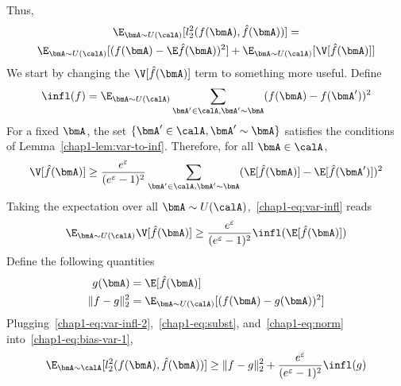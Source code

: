 Thus, 
\begin{multline}\label{chap1-eq:bias-var-1}
  \E_{\bmA \sim U(\calA)}[l_2^2(f(\bmA),\hat{f}(\bmA))] = \\ \E_{\bmA \sim
  U(\calA)}[(f(\bmA) - \E\hat{f}(\bmA))^2] + \E_{\bmA \sim
  U(\calA)}[\V[\hat{f}(\bmA)]]
\end{multline}
We start by changing the $\V[\hat{f}(\bmA)]$ term to something more useful. Define
\[
    \infl(f) = \E_{\bmA \sim U(\calA)} \sum_{\bmA' \in \calA, \bmA' \sim \bmA} (f(\bmA) - f(\bmA'))^2
\]
For a fixed $\bmA$, the set $\{\bmA' \in \calA, \bmA' \sim \bmA\}$ satisfies the conditions of Lemma~\ref{chap1-lem:var-to-inf}. Therefore, for all $\bmA \in \calA$, 
\begin{equation}\label{chap1-eq:var-infl}
\V[\hat{f}(\bmA)] \geq \frac{e^\varepsilon}{(e^\varepsilon-1)^2} \sum_{\bmA' \in \calA, \bmA' \sim \bmA} (\E[\hat{f}(\bmA)] - \E[\hat{f}(\bmA')])^2
\end{equation}
Taking the expectation over all $\bmA \sim U(\calA)$,~\eqref{chap1-eq:var-infl} reads 
\begin{equation}\label{chap1-eq:var-infl-2}
    \E_{\bmA \sim U(\calA)} \V[\hat{f}(\bmA)] \geq \frac{e^\varepsilon}{(e^\varepsilon-1)^2} \infl(\E[\hat{f}(\bmA)])
\end{equation}
Define the following quantities
\begin{align}
    g(\bmA) &= \E[\hat{f}(\bmA)] \label{chap1-eq:subst} \\
    \|f-g\|_2^2 &= \E_{\bmA \sim U(\calA)}[(f(\bmA) - g(\bmA))^2] \label{chap1-eq:norm}
\end{align}
Plugging~\eqref{chap1-eq:var-infl-2},~\eqref{chap1-eq:subst}, and~\eqref{chap1-eq:norm} into~\eqref{chap1-eq:bias-var-1},
\begin{equation}\label{chap1-eq:bias-var-3}
  \E_{\bmA \sim \calA}[l_2^2(f(\bmA), \hat{f}(\bmA))] \geq \|f-g\|_2^2  +
  \frac{e^\varepsilon}{(e^\varepsilon-1)^2} \infl(g)
\end{equation}

